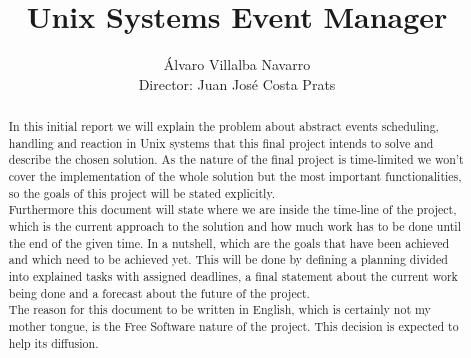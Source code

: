 \documentclass[a4paper,11pt]{scrartcl}
\title{Unix Systems Event Manager}
\author{Álvaro Villalba Navarro\\
  Director: Juan José Costa Prats
}
\begin{document}
\maketitle

\begin{abstract}
In this initial report we will explain the problem about abstract events 
scheduling, handling and reaction in Unix systems that this final project 
intends to solve and describe the chosen solution. As the nature of the final 
project is time-limited we won't cover the implementation of the whole solution 
but the most important functionalities, so the goals of this project will be 
stated explicitly.\\
Furthermore this document will state where we are inside the time-line of the 
project, which is the current approach to the solution and how much work has to 
be done until the end of the given time. In a nutshell, which are the goals 
that have been achieved and which need to be achieved yet. This will be done by
defining a planning divided into explained tasks with assigned deadlines, a
final statement about the current work being done and a forecast about the
future of the project.\\
The reason for this document to be written in English, which is certainly not 
my mother tongue, is the Free Software nature of the project. This decision is 
expected to help its diffusion.
\end{abstract}

\newpage
\tableofcontents
\newpage
\end{document}
